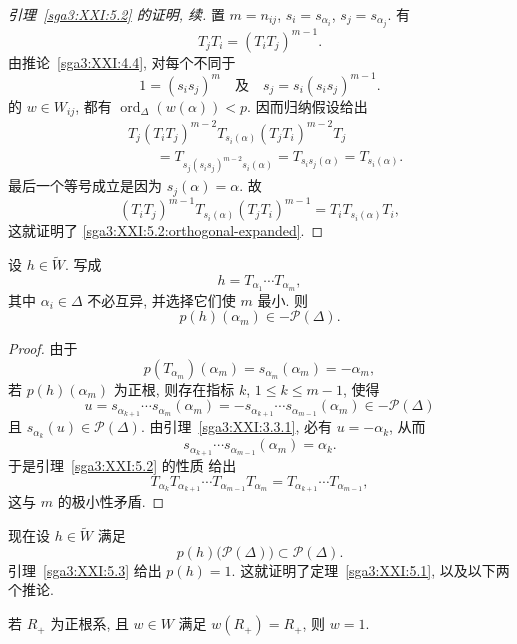 \begin{proof}[引理~\ref{sga3:XXI:5.2} 的证明, 续]
置 \(m=n_{ij}\), \(s_i=s_{\alpha_i}\), \(s_j=s_{\alpha_j}\). 有
\[
 T_jT_i=(T_iT_j)^{m-1}.
\]
由推论~\ref{sga3:XXI:4.4}, 对每个不同于
\[
 1=(s_is_j)^m
 \quad\text{及}\quad
 s_j=s_i(s_is_j)^{m-1}.
\]
的 \(w\in W_{ij}\), 都有 \(\operatorname{ord}_\Delta(w(\alpha))<p\). 因而归纳假设给出
\[
\begin{split}
 &T_j(T_iT_j)^{m-2}T_{s_i(\alpha)}
       (T_jT_i)^{m-2}T_j\\
 &\qquad
 =T_{s_j(s_is_j)^{m-2}s_i(\alpha)}
 =T_{s_is_j(\alpha)}
 =T_{s_i(\alpha)}.
\end{split}
\]
最后一个等号成立是因为 \(s_j(\alpha)=\alpha\). 故
\[
 (T_iT_j)^{m-1}T_{s_i(\alpha)}(T_jT_i)^{m-1}
 =T_iT_{s_i(\alpha)}T_i,
\]
这就证明了 \eqref{sga3:XXI:5.2:orthogonal-expanded}.
\end{proof}

\begin{lemma}\label{sga3:XXI:5.3}
设 \(h\in\widetilde W\). 写成
\[
 h=T_{\alpha_1}\cdots T_{\alpha_m},
\]
其中 \(\alpha_i\in\Delta\) 不必互异, 并选择它们使 \(m\) 最小. 则
\[
 p(h)(\alpha_m)\in-\mathscr{P}(\Delta).
\]
\end{lemma}

\begin{proof}
由于
\[
 p(T_{\alpha_m})(\alpha_m)
 =s_{\alpha_m}(\alpha_m)=-\alpha_m,
\]
若 \(p(h)(\alpha_m)\) 为正根, 则存在指标 \(k\), \(1\le k\le m-1\), 使得
\[
 u=s_{\alpha_{k+1}}\cdots s_{\alpha_m}(\alpha_m)
 =-s_{\alpha_{k+1}}\cdots s_{\alpha_{m-1}}(\alpha_m)
 \in-\mathscr{P}(\Delta)
\]
且 \(s_{\alpha_k}(u)\in\mathscr{P}(\Delta)\). 由引理~\ref{sga3:XXI:3.3.1}, 必有 \(u=-\alpha_k\), 从而
\[
 s_{\alpha_{k+1}}\cdots s_{\alpha_{m-1}}(\alpha_m)=\alpha_k.
\]
于是引理~\ref{sga3:XXI:5.2} 的性质  给出
\[
 T_{\alpha_k}T_{\alpha_{k+1}}\cdots
 T_{\alpha_{m-1}}T_{\alpha_m}
 =
 T_{\alpha_{k+1}}\cdots T_{\alpha_{m-1}},
\]
这与 \(m\) 的极小性矛盾.
\end{proof}

现在设 \(h\in\widetilde W\) 满足
\[
 p(h)\bigl(\mathscr{P}(\Delta)\bigr)
 \subset\mathscr{P}(\Delta).
\]
引理~\ref{sga3:XXI:5.3} 给出 \(p(h)=1\). 这就证明了定理~\ref{sga3:XXI:5.1}, 以及以下两个推论.

\begin{corollary}\label{sga3:XXI:5.4}
若 \(R_+\) 为正根系, 且 \(w\in W\) 满足 \(w(R_+)=R_+\), 则 \(w=1\).
\end{corollary}

